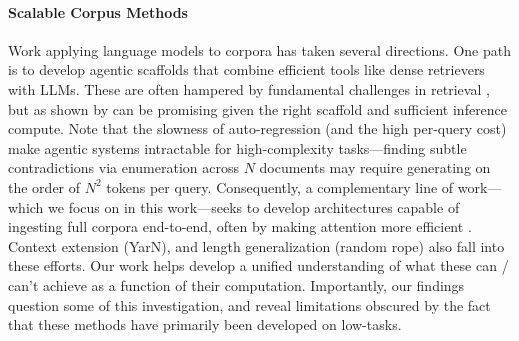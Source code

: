 \paragraph{Scalable Corpus Methods} Work applying language models to corpora has taken several directions. One path is to develop agentic scaffolds that combine efficient tools like dense retrievers \cite{Khattab2020ColBERTEA, Karpukhin2020DensePR} with LLMs. These are often hampered by fundamental challenges in retrieval \citep{Weller2025OnTT, Su2024BRIGHTAR, Wei2025BrowseCompAS}, but as shown by \cite{Zhang2025RecursiveLM} can be promising given the right scaffold and sufficient inference compute. Note that  the slowness of auto-regression (and the high per-query cost) make agentic systems intractable for high-complexity tasks---finding subtle contradictions via enumeration across $N$ documents may require generating on the order of $N^2$ tokens per query. Consequently, a complementary line of work---which we focus on in this work---seeks to develop architectures capable of ingesting full corpora end-to-end, often by making attention more efficient \citep{Acharya2024StarAE, Beltagy2020LongformerTL, Ivgi2022SLED, Lu2024TurboRAGAR, Xiao2025EfficientLCICL, Izacard2020LeveragingPR, Zaheer2020BigBT, Katharopoulos2020TransformersAR, Yang2024GatedDN}. Context extension (YarN), and length generalization (random rope) also fall into these efforts. Our work helps develop a unified understanding of what these can / can't achieve as a function of their computation. Importantly, our findings question some of this investigation, and reveal limitations obscured by the fact that these methods have primarily been developed on low-\cname tasks.


